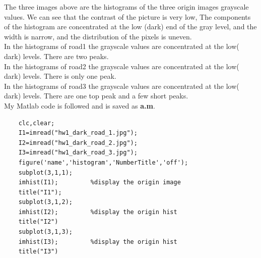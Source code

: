 \documentclass[
	12pt, %
]{fphw}
\begin{document}
The three images above are the histograms of the three origin images grayscale values. We can see that the contrast of the picture is very low, The components of the histogram are concentrated at the low (dark) end of the gray level, and the width is narrow, and the distribution of the pixels is uneven.\\
In the histograms of road1 the grayscale values are concentrated at the low( dark) levels. There are two peaks.\\
In the histograms of road2 the grayscale values are concentrated at the low( dark) levels. There is only one peak.\\
In the histograms of road3 the grayscale values are concentrated at the low( dark) levels. There are one top peak and a few short peaks.\\My Matlab code is followed and is saved as \textbf{a.m}.
\begin{lstlisting}
	clc,clear;
	I1=imread("hw1_dark_road_1.jpg");
	I2=imread("hw1_dark_road_2.jpg");
	I3=imread("hw1_dark_road_3.jpg");
	figure('name','histogram','NumberTitle','off');
	subplot(3,1,1);
	imhist(I1);         %display the origin image
	title("I1");        
	subplot(3,1,2);
	imhist(I2);         %display the origin hist
	title("I2")
	subplot(3,1,3);
	imhist(I3);         %display the origin hist
	title("I3")
\end{lstlisting}
\end{document}
